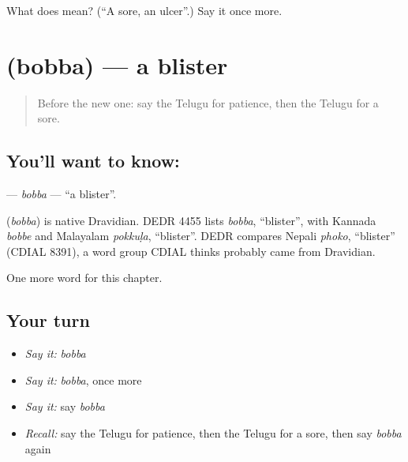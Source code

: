 \begin{tcolorbox}[breakable,colback=teal!4,colframe=teal!35!black,title={Before you move on}]
What does  mean? (\textquotedblleft{}A sore, an ulcer\textquotedblright{}.) Say it once more.
\end{tcolorbox}
\section[\texorpdfstring{\te{బొబ్బ} (bobba)}{బొబ్బ (bobba)}]{ (bobba) — a blister}

\label{lesson:TE-C169-bobba}



\begin{quote}
Before the new one: say the Telugu for patience, then the Telugu for a sore.
\end{quote}

\subsection*{You'll want to know: }
\textbf{} — \emph{bobba} — \textquotedblleft{}a blister\textquotedblright{}.

\begin{cousinweb}
\textbf{} (\emph{bobba}) is native Dravidian. DEDR 4455 lists \emph{bobba}, \textquotedblleft{}blister\textquotedblright{}, with Kannada \emph{bobbe} and Malayalam \emph{pokkuḷa}, \textquotedblleft{}blister\textquotedblright{}. DEDR compares Nepali \emph{phoko}, \textquotedblleft{}blister\textquotedblright{} (CDIAL 8391), a word group CDIAL thinks probably came from Dravidian.
\end{cousinweb}

\begin{grammarlens}[title={What you've built}]
One more word for this chapter.
\end{grammarlens}

\subsection*{Your turn}
\begin{itemize}
\raggedright
  \item \emph{Say it:} \emph{bobba}
  \item \emph{Say it:} \emph{bobba}, once more
  \item \emph{Say it:} say \emph{bobba}
  \item \emph{Recall:} say the Telugu for patience, then the Telugu for a sore, then say \emph{bobba} again
\end{itemize}

